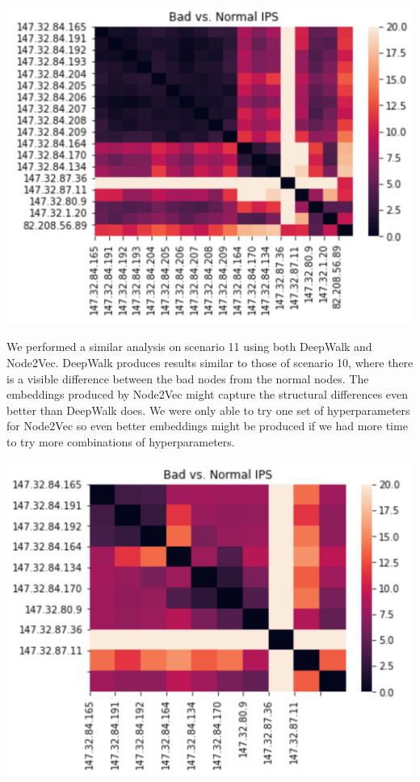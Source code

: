 \documentclass[10pt]{article}
\begin{document}
\begin{multicols}{2}
\includegraphics[scale=0.7]{1a.png}

We performed a similar analysis on scenario 11 using both DeepWalk and Node2Vec. DeepWalk produces results similar to those of scenario 10, where there is a visible difference between the bad nodes from the normal nodes. The embeddings produced by Node2Vec might capture the structural differences even better than DeepWalk does. We were only able to try one set of hyperparameters for Node2Vec so even better embeddings might be produced if we had more time to try more combinations of hyperparameters. \newline

\includegraphics[scale=.7]{2a}


\end{multicols}
\end{document}

